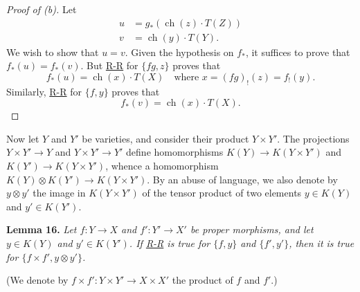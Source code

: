 \documentclass{article}
\newenvironment{itenv}[1]
  {\phantomsection\par\medskip\noindent\textbf{#1.}\itshape}
  {\par\medskip}
\DeclareMathOperator{\ch}{ch}
\begin{document}
\begin{proof}[Proof of (b)]
  Let
  \begin{align*}
    u &= g_*(\ch(z)\cdot T(Z))
  \\v &= \ch(y)\cdot T(Y).
  \end{align*}
  We wish to show that $u=v$.
  Given the hypothesis on $f_*$, it suffices to prove that $f_*(u)=f_*(v)$.
  But \hyperref[theoremriemannroch]{R-R} for $\{fg,z\}$ proves that
  \[
    f_*(u) = \ch(x)\cdot T(X)
    \quad
    \mbox{where $x=(fg)_!(z)=f_!(y)$.}
  \]
  Similarly, \hyperref[theoremriemannroch]{R-R} for $\{f,y\}$ proves that
  \[
    f_*(v) = \ch(x)\cdot T(X).
  \]
\end{proof}

Now let $Y$ and $Y'$ be varieties, and consider their product $Y\times Y'$.
The projections $Y\times Y'\to Y$ and $Y\times Y'\to Y'$ define homomorphisms $K(Y)\to K(Y\times Y')$ and $K(Y')\to K(Y\times Y')$, whence a homomorphism $K(Y)\otimes K(Y')\to K(Y\times Y')$.
By an abuse of language, we also denote by $y\otimes y'$ the image in $K(Y\times Y')$ of the tensor product of two elements $y\in K(Y)$ and $y'\in K(Y')$.

\begin{itenv}{Lemma 16}
\label{lemma16}
  Let $f\colon Y\to X$ and $f'\colon Y'\to X'$ be proper morphisms, and let $y\in K(Y)$ and $y'\in K(Y')$.
  If \hyperref[theoremriemannroch]{R-R} is true for $\{f,y\}$ and $\{f',y'\}$, then it is true for $\{f\times f',y\otimes y'\}$.
\end{itenv}

(We denote by $f\times f'\colon Y\times Y'\to X\times X'$ the product of $f$ and $f'$.)
\end{document}
